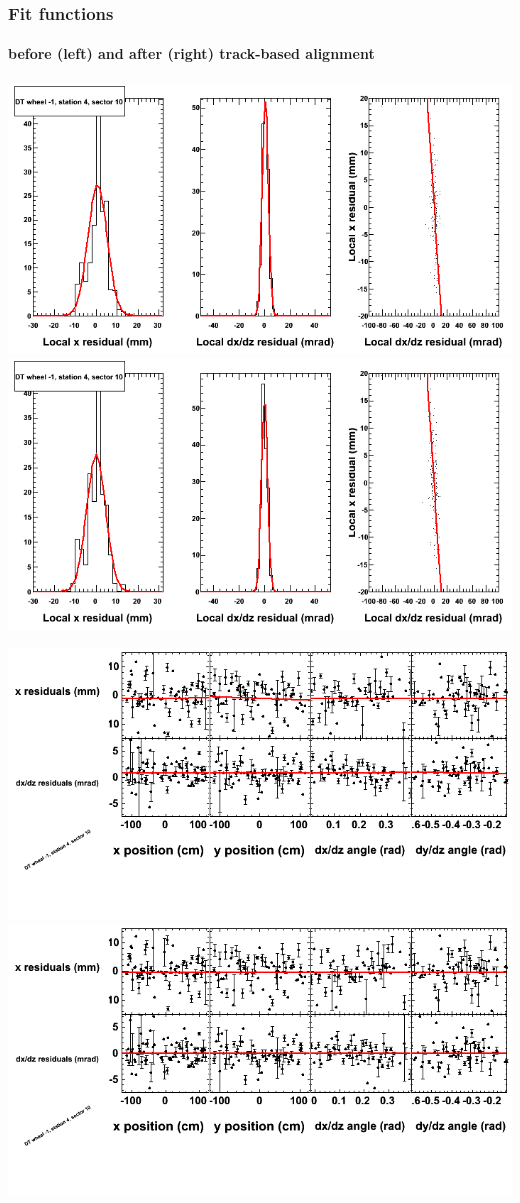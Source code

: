 \documentclass[compress]{beamer}
\begin{document}
\begin{frame}
\frametitle{Fit functions}
\framesubtitle{before (left) and after (right) track-based alignment}
\includegraphics[width=0.5\linewidth]{fitfunctions_re01/MBwhBst4sec10_bellcurves.png} \includegraphics[width=0.5\linewidth]{fitfunctions_re05/MBwhBst4sec10_bellcurves.png}

\includegraphics[width=0.5\linewidth]{fitfunctions_re01/MBwhBst4sec10_polynomials.png} \includegraphics[width=0.5\linewidth]{fitfunctions_re05/MBwhBst4sec10_polynomials.png}
\end{frame}
\end{document}
